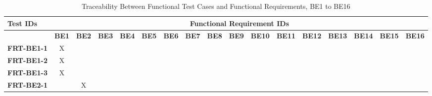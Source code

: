 \documentclass[12pt, titlepage]{article}
\begin{document}
\begin{landscape}
	\begin{longtable}{|l|cccccccccccccccc|}
		\caption{Traceability Between Functional Test Cases and Functional Requirements, BE1 to BE16}                                                                                                                                                                                                                           \\
		\hline
		\textbf{Test IDs}   & \multicolumn{16}{c|}{\textbf{Functional Requirement IDs}}                                                                                                                                                                                                                                         \\
		\hline
		~                   & \textbf{BE1}                                              & \textbf{BE2} & \textbf{BE3} & \textbf{BE4} & \textbf{BE5} & \textbf{BE6} & \textbf{BE7} & \textbf{BE8} & \textbf{BE9} & \textbf{BE10} & \textbf{BE11} & \textbf{BE12} & \textbf{BE13} & \textbf{BE14} & \textbf{BE15} & \textbf{BE16} \\
		\hline
		\textbf{FRT-BE1-1}  & X                                                         & ~            & ~            & ~            & ~            & ~            & ~            & ~            & ~            & ~             & ~             & ~             & ~             & ~             & ~             & ~             \\
		\textbf{FRT-BE1-2}  & X                                                         & ~            & ~            & ~            & ~            & ~            & ~            & ~            & ~            & ~             & ~             & ~             & ~             & ~             & ~             & ~             \\
		\textbf{FRT-BE1-3}  & X                                                         & ~            & ~            & ~            & ~            & ~            & ~            & ~            & ~            & ~             & ~             & ~             & ~             & ~             & ~             & ~             \\
		\textbf{FRT-BE2-1}  & ~                                                         & X            & ~            & ~            & ~            & ~            & ~            & ~            & ~            & ~             & ~             & ~             & ~             & ~             & ~             & ~             \\

\end{longtable}
\end{landscape}
\end{document}
